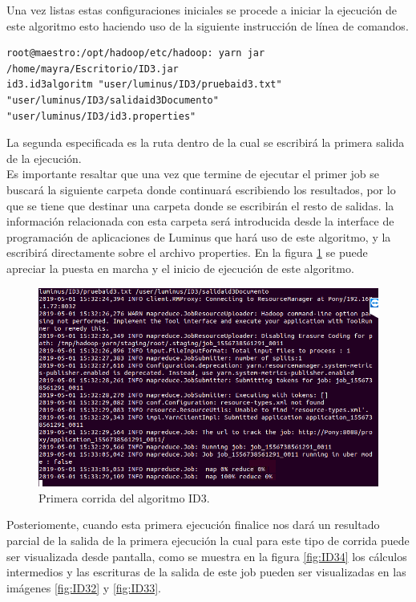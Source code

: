 Una vez listas estas configuraciones iniciales se procede a iniciar la ejecución de este algoritmo esto haciendo uso de la siguiente instrucción de línea de comandos.
 \begin{verbatim}
root@maestro:/opt/hadoop/etc/hadoop: yarn jar /home/mayra/Escritorio/ID3.jar 
id3.id3algoritm "user/luminus/ID3/pruebaid3.txt" "user/luminus/ID3/salidaid3Documento" "user/luminus/ID3/id3.properties"
\end{verbatim} 
La segunda especificada es la ruta dentro de la cual se escribirá la primera salida de la ejecución.\\
Es importante resaltar que una vez que termine de ejecutar el primer job se buscará la siguiente carpeta donde continuará escribiendo los resultados, por lo que se tiene que destinar una carpeta donde se escribirán el resto de salidas. la información relacionada con esta carpeta será introducida desde la interface de programación de aplicaciones de Luminus que hará uso de este algoritmo, y la escribirá directamente sobre el archivo properties.
En la figura \ref{fig:ID31} se puede apreciar la puesta en marcha y el inicio de ejecución de este algoritmo.\\
\begin{figure}[H]
	\begin{center}
		\hypertarget{fig:ID31}{\hspace{1pt}}
		\includegraphics[width=.7\textwidth]{capitulo4a/images/ID3_1.png}
		\caption{Primera corrida del algoritmo ID3.}
		\label{fig:ID31}
	\end{center}
\end{figure}
Posteriomente, cuando esta primera ejecución finalice nos dará un resultado parcial de la salida de la primera ejecución la cual para este tipo de corrida puede ser visualizada desde pantalla, como se muestra en la figura \ref{fig:ID34} los cálculos intermedios y las escrituras de la salida de este job pueden ser visualizadas en las imágenes \ref{fig:ID32} y \ref{fig:ID33}. 
